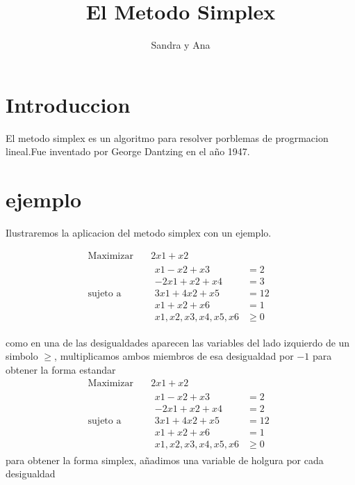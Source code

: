\documentclass{article}
\title{El Metodo Simplex}
\author{Sandra y Ana}
\begin{document}
\maketitle

 
\section{Introduccion}
\label{sec:introduccion}

El metodo simplex es un algoritmo para resolver porblemas de progrmacion
lineal.Fue inventado por George Dantzing en el año 1947.

\section{ejemplo}
\label{sec:ejemplo}

Ilustraremos la aplicacion del metodo simplex con un ejemplo.
 
 \begin{equation*} \begin{aligned} \text{Maximizar} \quad & 2x1+x2\\
     \text{sujeto a} \quad &
     \begin{aligned}
       x1-x2+x3 &= 2\\
       -2x1+x2+x4&=3\\
       3x1+4x2+x5&=12\\
       x1+x2+x6 &=1\\
       x1,x2,x3,x4,x5,x6 &\geq 0
     \end{aligned} \end{aligned} \end{equation*}

como en una de las desigualdades aparecen las variables del lado
izquierdo de un simbolo $\geq$, multiplicamos ambos miembros de esa
desigualdad por $-1$ para obtener la forma estandar
 \begin{equation*} \begin{aligned} \text{Maximizar} \quad & 2x1+x2\\
     \text{sujeto a} \quad &
     \begin{aligned}
       x1-x2+x3 &= 2\\
       -2x1+x2+x4&=2\\
       3x1+4x2+x5&=12\\
       x1+x2+x6 &=1\\
       x1,x2,x3,x4,x5,x6 &\geq 0
     \end{aligned} \end{aligned} \end{equation*}
para obtener la forma simplex, añadimos una variable de holgura por
cada desigualdad
\end{document}
